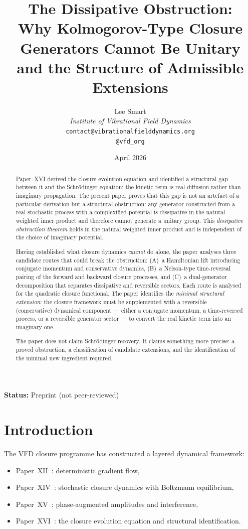 \documentclass[12pt]{article}
\title{The Dissipative Obstruction:\\Why Kolmogorov-Type Closure Generators Cannot Be Unitary\\and the Structure of Admissible Extensions}
\author{%
  Lee Smart\\[4pt]
  \textit{Institute of Vibrational Field Dynamics}\\[2pt]
  \texttt{contact@vibrationalfielddynamics.org}\\[2pt]
  \texttt{@vfd\_org}%
}
\date{April 2026}
\begin{document}
\maketitle

\noindent\textbf{Status:} Preprint (not peer-reviewed)

\begin{abstract}
Paper~XVI derived the closure evolution equation and identified a structural gap between it and the Schr\"odinger equation: the kinetic term is real diffusion rather than imaginary propagation. The present paper proves that this gap is not an artefact of a particular derivation but a structural obstruction: any generator constructed from a real stochastic process with a complexified potential is dissipative in the natural weighted inner product and therefore cannot generate a unitary group. This \textit{dissipative obstruction theorem} holds in the natural weighted inner product and is independent of the choice of imaginary potential.

Having established what closure dynamics \textit{cannot} do alone, the paper analyses three candidate routes that could break the obstruction: (A)~a Hamiltonian lift introducing conjugate momentum and conservative dynamics, (B)~a Nelson-type time-reversal pairing of the forward and backward closure processes, and (C)~a dual-generator decomposition that separates dissipative and reversible sectors. Each route is analysed for the quadratic closure functional. The paper identifies the \textit{minimal structural extension}: the closure framework must be supplemented with a reversible (conservative) dynamical component --- either a conjugate momentum, a time-reversed process, or a reversible generator sector --- to convert the real kinetic term into an imaginary one.

The paper does not claim Schr\"odinger recovery. It claims something more precise: a proved obstruction, a classification of candidate extensions, and the identification of the minimal new ingredient required.
\end{abstract}

\section{Introduction}\label{sec:intro}

The VFD closure programme has constructed a layered dynamical framework:
\begin{itemize}
    \item Paper~XII~\citep{SmartXII}: deterministic gradient flow,
    \item Paper~XIV~\citep{SmartXIV}: stochastic closure dynamics with Boltzmann equilibrium,
    \item Paper~XV~\citep{SmartXV}: phase-augmented amplitudes and interference,
    \item Paper~XVI~\citep{SmartXVI}: the closure evolution equation and structural identification.
\end{itemize}
\end{document}
